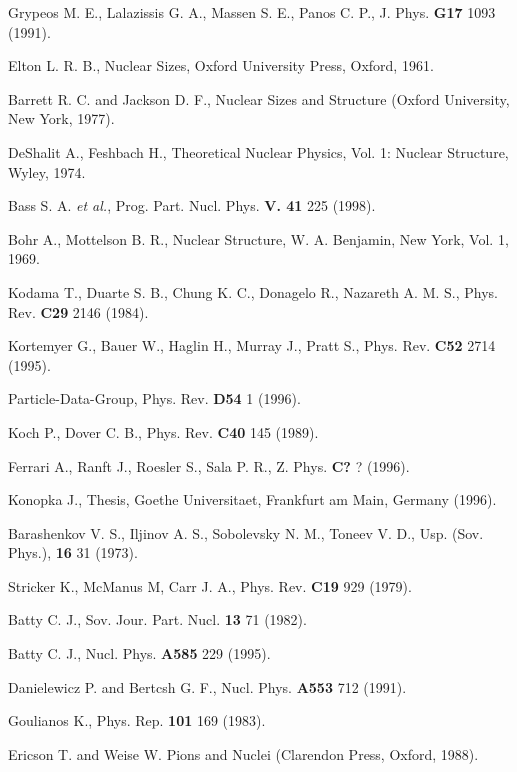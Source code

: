 \begin{thebibliography}{599}

 Grypeos M. E., Lalazissis G. A., Massen S. E., Panos C. P.,
J. Phys. {\bf G17} 1093 (1991).

 Elton L. R. B., Nuclear Sizes, Oxford University Press, 
Oxford, 1961.

 Barrett R. C. and Jackson D. F., Nuclear Sizes and Structure
(Oxford University, New York, 1977).

 DeShalit A., Feshbach H., Theoretical Nuclear Physics, Vol. 1: 
Nuclear Structure, Wyley, 1974.

 Bass S. A. {\it et al.}, Prog. Part. Nucl. Phys. {\bf V. 41} 
225 (1998).

 Bohr A., Mottelson B. R., Nuclear Structure, W. A. Benjamin, 
New York, Vol. 1, 1969.

 Kodama T., Duarte S. B., Chung K. C., Donagelo R., 
Nazareth A. M. S., Phys. Rev. {\bf C29} 2146 (1984).

 Kortemyer G., Bauer W., Haglin H., Murray J., 
 Pratt S., Phys. Rev. {\bf C52} 2714 (1995).
 
 Particle-Data-Group, Phys. Rev. {\bf D54} 1 (1996).

 Koch P., Dover C. B., Phys. Rev. {\bf C40} 145 (1989).

Ferrari A., Ranft J., Roesler S., Sala P. R., Z. Phys. {\bf C?} 
? (1996).

 Konopka J., Thesis, Goethe Universitaet, Frankfurt am Main, 
Germany (1996).

 Barashenkov V. S., Iljinov A. S., Sobolevsky N. M., 
Toneev V. D., Usp. (Sov. Phys.), {\bf 16} 31 (1973).

Stricker K., McManus M, Carr J. A., Phys. Rev. {\bf C19} 929
(1979).


 Batty C. J., Sov. Jour. Part. Nucl. {\bf 13} 71 (1982).

 Batty C. J.,  Nucl. Phys. {\bf A585} 229 (1995).

 Danielewicz P. and Bertcsh G. F., Nucl. Phys. {\bf A553} 712 
(1991).

 Goulianos K., Phys. Rep. {\bf 101} 169 (1983). 

 Ericson T. and Weise W. Pions and Nuclei (Clarendon Press,
 Oxford, 1988). 

\end{thebibliography}
